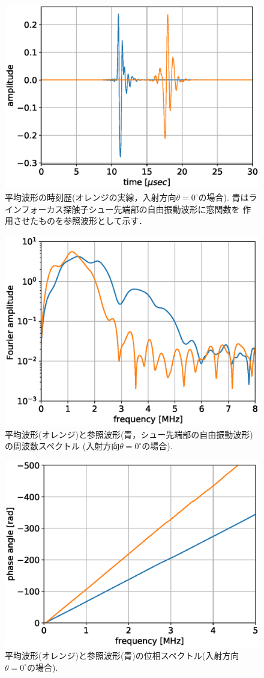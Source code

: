 \begin{figure}[h]
	\begin{center}
	\includegraphics[width=0.6\linewidth]{Figs/fig8.eps} 
	\end{center}
	\caption{
		平均波形の時刻歴(オレンジの実線，入射方向$\theta=0^{\circ}$の場合).
		青はラインフォーカス探触子シュー先端部の自由振動波形に窓関数を
		作用させたものを参照波形として示す．
	} 
	\label{fig:fig8}
\end{figure}
\begin{figure}[h]
	\begin{center}
	\includegraphics[width=0.6\linewidth]{Figs/fig9.eps} 
	\end{center}
	\caption{
		平均波形(オレンジ)と参照波形(青，シュー先端部の自由振動波形)の周波数スペクトル
		(入射方向$\theta=0^{\circ}の場合$).
	} 
	\label{fig:fig9}
\end{figure}
\begin{figure}[h]
	\begin{center}
	\includegraphics[width=0.7\linewidth]{Figs/fig10.eps} 
	\end{center}
	\caption{
		平均波形(オレンジ)と参照波形(青)の位相スペクトル(入射方向$\theta=0^{\circ}$の場合).
	} 
	\label{fig:fig10}
\end{figure}
